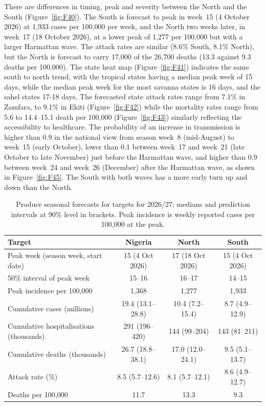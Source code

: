 \documentclass[12pt,a4paper]{article}
\theoremstyle{definition}
\theoremstyle{remark}
\begin{document}
There are differences in timing, peak and severity between the North and the South (Figure~\ref{fig:F40}). The South is forecast to peak in week~15 (4 October 2026) at 1{,}933 cases per 100{,}000 per week, and the North two weeks later, in week~17 (18 October 2026), at a lower peak of 1{,}277 per 100{,}000 but with a larger Harmattan wave. The attack rates are similar (8.6\% South, 8.1\% North), but the North is forecast to carry 17{,}000 of the 26{,}700 deaths (13.3 against 9.3 deaths per 100{,}000). The state heat map (Figure~\ref{fig:F41}) indicates the same south to north trend, with the tropical states having a median peak week of 15 days, while the median peak week for the most savanna states is 16 days, and the sahel states 17-18 days. The forecasted state attack rates range from 7.1\% in Zamfara, to 9.1\% in Ekiti (Figure~\ref{fig:F42}) while the mortality rates range from 5.6 to 14.4--15.1 death per 100,000 (Figure~\ref{fig:F43}) similarly reflecting the accessibility to healthcare. The probability of an increase in transmission is higher than 0.9 in the national view from season week~8 (mid-August) to week~15 (early October), lower than 0.1 between week~17 and week~21 (late October to late November) just before the Harmattan wave, and higher than 0.9 between week~24 and week~26 (December) after the Harmattan wave, as shown in Figure~\ref{fig:F45}. The South with both waves has a more early turn up and down than the North.

\begin{table}[!htbp]
\caption{Produce seasonal forecasts for targets for 2026/27: medians and prediction intervals at 90\% level in brackets. Peak incidence is weekly reported cases per 100{,}000 at the peak.}
\label{tab:forecast_summary}
\centering
\footnotesize
\setlength{\tabcolsep}{4pt}
\begin{tabular}{lccc}
\toprule
Target & Nigeria & North & South\\
\midrule
Peak week (season week, start date) & 15 (4 Oct 2026) & 17 (18 Oct 2026) & 15 (4 Oct 2026)\\
50\% interval of peak week & 15--16 & 16--17 & 14--15\\
Peak incidence per 100{,}000 & 1{,}368 & 1{,}277 & 1{,}933\\
Cumulative cases (millions) & 19.4 (13.1--28.8) & 10.4 (7.2--15.4) & 8.7 (4.9--12.9)\\
Cumulative hospitalisations (thousands) & 291 (196--420) & 144 (99--204) & 143 (81--211)\\
Cumulative deaths (thousands) & 26.7 (18.8--38.1) & 17.0 (12.0--24.1) & 9.5 (5.1--13.7)\\
Attack rate (\%) & 8.5 (5.7--12.6) & 8.1 (5.7--12.1) & 8.6 (4.9--12.7)\\
Deaths per 100{,}000 & 11.7 & 13.3 & 9.3\\
\bottomrule
\end{tabular}
\end{table}
\end{document}
